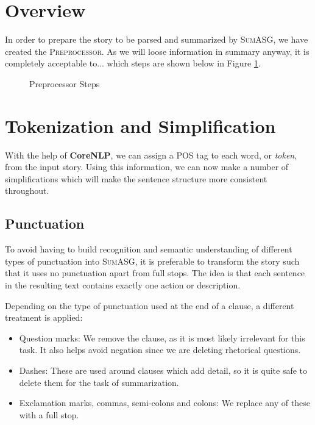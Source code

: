 \section{Overview}

In order to prepare the story to be parsed and summarized by \textsc{SumASG}, we have created the \textsc{Preprocessor}. As we will loose information in summary anyway, it is completely acceptable to... which steps are shown below in Figure \ref{fig:preprocessor_pipeline}.

\begin{figure}[H]
\centering
{}
\caption{Preprocessor Steps}
\label{fig:preprocessor_pipeline}
\end{figure}

\section{Tokenization and Simplification}

With the help of \textbf{CoreNLP}, we can assign a POS tag to each word, or \textit{token}, from the input story. Using this information, we can now make a number of simplifications which will make the sentence structure more consistent throughout.

\subsection{Punctuation}
\label{subsec:punctuation}

To avoid having to build recognition and semantic understanding of different types of punctuation into \textsc{SumASG}, it is preferable to transform the story such that it uses no punctuation apart from full stops. The idea is that each sentence in the resulting text contains exactly one action or description.

Depending on the type of punctuation used at the end of a clause, a different treatment is applied:
\begin{itemize}[nolistsep]
\item Question marks: We remove the clause, as it is most likely irrelevant for this task. It also helps avoid negation since we are deleting rhetorical questions.
\item Dashes: These are used around clauses which add detail, so it is quite safe to delete them for the task of summarization.
\item Exclamation marks, commas, semi-colons and colons: We replace any of these with a full stop.
\end{itemize}

